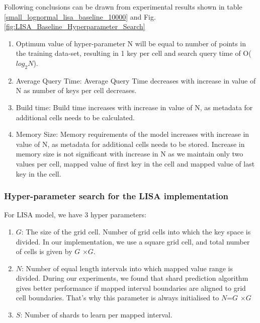 \begin{mscconclusion}
	Following conclusions can be drawn from experimental results shown in table \ref{small_lognormal_lisa_baseline_10000} and Fig. \ref{fig:LISA_Baseline_Hyperparameter_Search}
\begin{enumerate}
    \item Optimum value of hyper-parameter N will be equal to number of points in the training data-set, resulting in 1 key per cell and search query time of O($log_{2}N$).
	
	\item Average Query Time:  Average Query Time decreases with increase in value of N as number of keys per cell decreases.
	\item Build time: Build time increases with increase in value of N, as metadata for additional cells needs to be calculated. 
	\item Memory Size:  Memory requirements of the model increases with increase in value of N, as metadata for additional cells needs to be stored. Increase  in memory size is not significant with increase in N as we maintain only two values per cell, mapped value of first key in the cell and mapped value of last key in the cell.
\end{enumerate}
\end{mscconclusion}

\subsubsection {Hyper-parameter search for the LISA implementation}
For LISA model, we have 3 hyper parameters:
\begin{enumerate}
	\item $G$: The size of the grid cell. Number of grid cells into which the key space is divided. In our implementation, we use a square grid cell, and total number of cells is given by $G$ $\times G$.
	\item $N$: Number of equal length intervals into which mapped value range is divided. During our experiments, we found that shard prediction algorithm gives better performance if mapped interval boundaries are aligned to grid cell boundaries. That's why this parameter is always initialised to $N$=$G$ $\times G$   
	\item $S$: Number of shards to learn per mapped interval. 
\end{enumerate}

